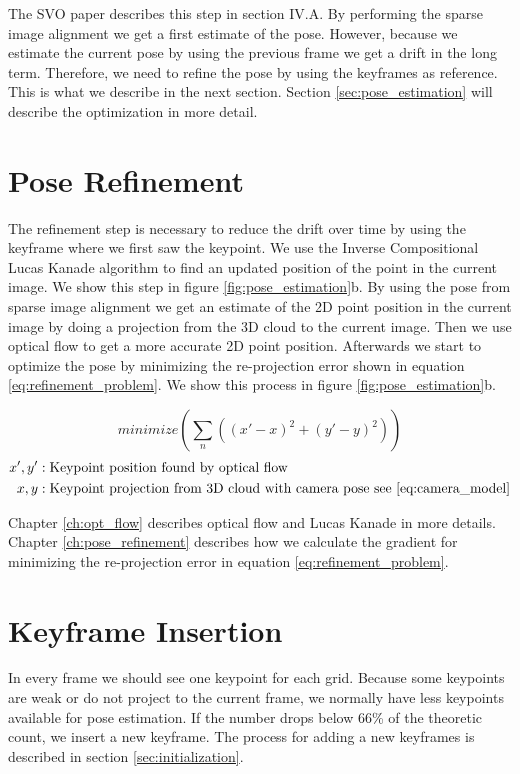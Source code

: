 \documentclass[11pt,a4paper,titlepage,oneside]{report}
\begin{document}
The SVO paper \cite{svo} describes this step in section IV.A. By performing the sparse image alignment we get a first estimate of the pose. However, because we estimate the current pose by using the previous frame we get a drift in the long term. Therefore, we need to refine the pose by using the keyframes as reference. This is what we describe in the next section. Section \ref{sec:pose_estimation} will describe the optimization in more detail.

\section{Pose Refinement}\label{sec:refinement}

The refinement step is necessary to reduce the drift over time by using the keyframe where we first saw the keypoint. We use the Inverse Compositional Lucas Kanade algorithm to find an updated position of the point in the current image. We show this step in figure \ref{fig:pose_estimation}b. By using the pose from sparse image alignment we get an estimate of the 2D point position in the current image by doing a projection from the 3D cloud to the current image. Then we use optical flow to get a more accurate 2D point position. Afterwards we start to optimize the pose by minimizing the re-projection error shown in equation \ref{eq:refinement_problem}. We show this process in figure \ref{fig:pose_estimation}b.

\begin{equation}\label{eq:refinement_problem}
  minimize(\sum_n ((x'-x)^2+(y'-y)^2))
\end{equation}
\begin{align*}
  x',y'   &: \text{Keypoint position found by optical flow}\\
  x,y     &: \text{Keypoint projection from 3D cloud with camera pose see \ref{eq:camera_model}}
\end{align*}

Chapter \ref{ch:opt_flow} describes optical flow and Lucas Kanade in more details. Chapter \ref{ch:pose_refinement} describes how we calculate the gradient for minimizing the re-projection error in equation \ref{eq:refinement_problem}.

\section{Keyframe Insertion}
In every frame we should see one keypoint for each grid. Because some keypoints are weak or do not project to the current frame, we normally have less keypoints available for pose estimation. If the number drops below 66\% of the theoretic count, we insert a new keyframe. The process for adding a new keyframes is described in section \ref{sec:initialization}.
\end{document}
